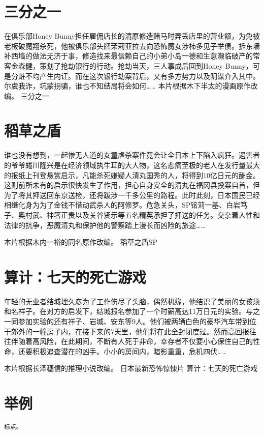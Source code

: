 \documentclass[11pt,a4paper]{article}
\begin{document}
\section{三分之一}
在俱乐部Honey Bunny担任雇佣店长的清原修造赌马时弄丢店里的营业额，为免被老板破魔翔杀死，他被俱乐部头牌茉莉亚拉去向恐怖魔女涉柿多见子举债。拆东墙补西墙的做法无济于事，修造找来最信赖自己的小弟小岛一德和生意濒临破产的常客金森健，策划了抢劫银行的行动。抢劫当天，三人事成后回到Honey Bunny，可是分赃不均产生内讧。而在这次银行劫案背后，又有多方势力以及阴谋介入其中。尔虞我诈，坑蒙拐骗，谁也不知结局将会如何……
本片根据木下半太的漫画原作改编。
三分之一
\footnotemark[3]

\noindent
{}
\setlength{\hangindent}{2em}

\section{稻草之盾}
谁也没有想到，一起惨无人道的女童虐杀案件竟会让全日本上下陷入疯狂。遇害者的爷爷蜷川隆兴是在经济领域执牛耳的大人物，这名悲痛至极的老人在发行量最大的报纸上刊登悬赏启示，凡能杀死嫌疑人清丸国秀的人，将得到10亿日元的酬金。这则前所未有的启示很快发生了作用，担心自身安全的清丸在福冈县投案自首，但为了将其押送回东京送检，还将跋涉一千多公里的路程。此时此刻，日本国民已经相继化身为为了金钱不惜动武杀人的阿修罗。危急关头，SP铭苅一基、白岩笃子、奥村武、神箸正贵以及关谷贤示等五名精英承担了押送的任务。交杂着人性和法律的抗争，恶魔清丸和保护他的警察踏上漫长而凶险的旅途……

本片根据木内一裕的同名原作改编。
稻草之盾SP

\section{算计：七天的死亡游戏}
年轻的无业者结城理久彦为了工作伤尽了头脑，偶然机缘，他结识了美丽的女孩须和名祥子。在对方的启发下，结城报名参加了一个时薪高达11万日元的实验。与之一同参加实验的还有祥子、岩城、安东等9人。他们被两辆白色的豪华汽车带到位于郊外的一幢房子内，在接下来的7天里，他们将在此全封闭度过。然而高回报往往伴随着高风险，在此期间，不断有人死于非命，幸存者不仅要小心保住自己的性命，还要积极追查潜在的凶手。小小的房间内，暗影重重，危机四伏……

本片根据长泽穗信的推理小说改编。
日本最新恐怖惊悚片 算计：七天的死亡游戏
\section{举例}
\begin{verbatim}
标点。
\end{verbatim}
 
\end{document}
